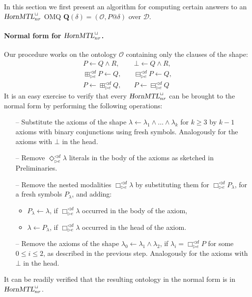 \documentclass{article}
\newcommand{\omq}{\boldsymbol Q}
\newcommand{\D}{\mathcal{D}}
\renewcommand{\O}{\mathcal{O}}
\newcommand{\hMTL}{\textsl{HornMTL}}
\newcommand{\dMTL}{\textsl{datalogMTL}}
\begin{document}
{{In this section we first present an algorithm for computing certain
answers to an $\hMTL^\Box_{nr}$ OMQ $\omq(\delta) = (\O,P@\delta)$
over
$\D$. %

\paragraph{Normal form for $\hMTL^\Box_{nr}$.} Our procedure works on the ontology $\O$ containing only the clauses of the shape:
%
\begin{align*}
   P \leftarrow Q \land R, & \quad \bot \leftarrow Q \land R,\\
  \boxplus^{\lhd d}_{\rhd e} P \leftarrow Q, & \quad \boxminus^{\lhd d}_{\rhd e} P \leftarrow Q,\\
   P\leftarrow \boxplus^{\lhd d}_{\rhd e} Q, & \quad P \leftarrow \boxminus^{\lhd d}_{\rhd e} Q
\end{align*}
%
It is an easy exercise to verify that every  $\hMTL^\Box_{nr}$ can be brought to the normal form by performing the following operations:
%
\begin{itemize}
  \item[--] Substitute the axioms of the shape $\lambda \leftarrow \lambda_1 \land \dots \land \lambda_k$ for $k \geq 3$ by $k-1$ axioms with binary conjunctions using fresh symbols. Analogously for the axioms with $\bot$ in the head.
  \item[--] Remove $\Diamond^{\lhd d}_{\rhd e} \lambda$ literals in the body of the axioms as sketched in Preliminaries.
  \item[--] Remove the nested modalities $\Box^{\lhd d}_{\rhd e} \lambda$ by substituting them for $\Box^{\lhd d}_{\rhd e} P_\lambda$, for a fresh symbols $P_\lambda$, and adding:
      \begin{itemize}
       \item $P_\lambda \leftarrow \lambda$, if $\Box^{\lhd d}_{\rhd e} \lambda$ occurred in the body of the axiom,
       \item $\lambda \leftarrow P_\lambda$, if $\Box^{\lhd d}_{\rhd e} \lambda$ occurred in the head of the axiom.
      \end{itemize}
  \item[--] Remove the axioms of the shape $\lambda_0 \leftarrow \lambda_1 \land \lambda_2$, if $\lambda_i = \Box^{\lhd d}_{\rhd e} P$ for some $0 \leq i \leq 2$, as described in the previous step. Analogously for the axioms with $\bot$ in the head.
\end{itemize}
%
It can be readily verified that the resulting ontology in the normal form is in $\hMTL^\Box_{nr}$.

}}
\end{document}
